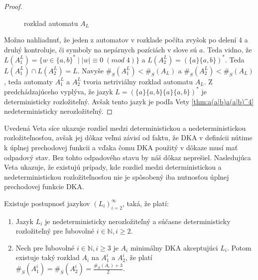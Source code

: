 \begin{proof}
\begin{figure}[H]
\caption{rozklad automatu $ A_L $}
\end{figure}

Možno nahliadnuť, že jeden z automatov v rozklade počíta zvyšok po delení 4 a druhý kontroluje, či symboly na nepárnych pozíciách v slove sú $ a $. Teda vidno, že $ L(A_1^L) = \lbrace w \in \lbrace a,b \rbrace^* \; | \; |w| \equiv 0 \; (mod \; 4) \rbrace $ a $ L(A_2^L) = (\lbrace a \rbrace \lbrace a,b \rbrace)^* $. Teda $ L(A_1^L) \cap L(A_2^L) = L $. Navyše $ \#_S(A_1^L) < \#_S(A_L) $ a $ \#_S(A_2^L) < \#_S(A_L) $, teda automaty $ A_1^L $ a $ A_2^L $ tvoria netriviálny rozklad automatu $ A_L $. Z predchádzajúceho vyplýva, že jazyk $ L = (\lbrace a \rbrace \lbrace a,b \rbrace \lbrace a \rbrace \lbrace a,b \rbrace)^* $ je deterministicky rozložiteľný. Avšak tento jazyk je podľa Vety \ref{thm:a(a|b)a(a|b)^4} nedeterministicky nerozložiteľný.
\end{proof}

Uvedená Veta síce ukazuje rozdiel medzi deterministickou a nedeterministickou rozložiteľnosťou, avšak jej dôkaz veľmi závisí od faktu, že DKA v definícii nútime k úplnej prechodovej funkcii a vďaka čomu DKA použitý v dôkaze musí mať odpadový stav. Bez tohto odpadového stavu by náš dôkaz neprešiel. Nasledujúca Veta ukazuje, že existujú prípady, kde rozdiel medzi deterministickou a nedeterministickou rozložiteľnosťou nie je spôsobený iba nutnosťou úplnej prechodovej funkcie DKA.

\begin{theorem}
\label{thm:ndet_vs_det_diff_big}
Existuje postupnosť jazykov $ (L_i)_{i=2}^{\infty} $, taká, že platí:
\begin{enumerate}[label=(\alph*)]
\item \label{thm:ndet_vs_det_diff_big_item_1} Jazyk $ L_i $ je nedeterministicky nerozložiteľný a súčasne deterministicky rozložiteľný pre ľubovolné $ i \in \mathbb{N}, i \geq 2 $.
\item \label{thm:ndet_vs_det_diff_big_item_2} Nech pre ľubovolné $ i \in \mathbb{N}, i \geq 3 $ je $ A_i $ minimálny DKA akceptujúci $ L_i $. Potom existuje taký rozklad $ A_i $ na $ A_1^i $ a $ A_2^i $, že platí $ \#_S(A_1^i)=\#_S(A_2^i)=\frac{\#_S(A_i)+3}{2} $.
\end{enumerate}
\end{theorem}

